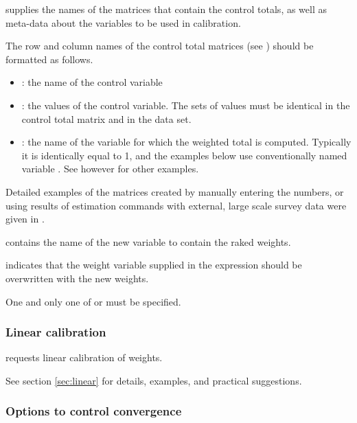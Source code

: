 \hangpara
{} \RB\stcmd{)}
supplies the names of the matrices that contain the control
totals, as well as meta-data about the variables to be used
in calibration.

\begin{sttech}
The row and column names of the control total matrices
(see ) should be formatted as follows.
\begin{itemize}
    \item {}: the name of the control variable
    \item {}: the values of the control variable. The sets of values
          must be identical in the control total matrix and in the data set.
    \item {}: the name of the variable for which the weighted total is computed.
          Typically it is identically equal to 1, and the examples below
          use conventionally named variable . See however
          \citet{kolenikov:hammer:2015} for other examples.
\end{itemize}

Detailed examples of the matrices created by manually entering the numbers,
or using results of estimation commands with external, large scale survey data
were given in \citet{kolenikov:2014}.

\end{sttech}

\hangpara
{}
contains the name of the new variable to contain the raked weights.

\hangpara
{} indicates that the weight variable supplied in the
\stcmd{[pw=\varname]} expression should be overwritten with the new weights.

One and only one of  or  must be specified.

\subsubsection{Linear calibration}

\hangpara
{}
requests linear calibration of weights.

See section \ref{sec:linear} for details, examples, and practical suggestions.


\subsubsection{Options to control convergence}

